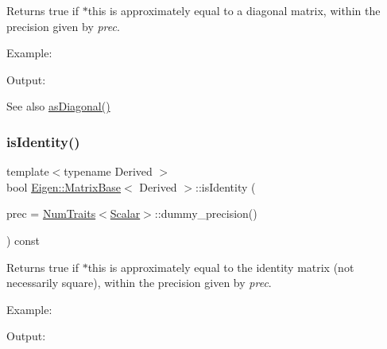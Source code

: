 \begin{DoxyReturn}{Returns}
true if $\ast$this is approximately equal to a diagonal matrix, within the precision given by {\itshape prec}.
\end{DoxyReturn}
Example\+: 
\begin{DoxyCodeInclude}{0}
\end{DoxyCodeInclude}
 Output\+: 
\begin{DoxyVerbInclude}
\end{DoxyVerbInclude}


\begin{DoxySeeAlso}{See also}
\mbox{\hyperlink{class_eigen_1_1_matrix_base_a14235b62c90f93fe910070b4743782d0}{as\+Diagonal()}} 
\end{DoxySeeAlso}
\mbox{\label{class_eigen_1_1_matrix_base_a4ccbd8dfa06e9d47b9bf84711f8b9d40}} 
\subsubsection{\texorpdfstring{isIdentity()}{isIdentity()}}
{\footnotesize\ttfamily template$<$typename Derived $>$ \\
bool \mbox{\hyperlink{class_eigen_1_1_matrix_base}{Eigen\+::\+Matrix\+Base}}$<$ Derived $>$\+::is\+Identity (\begin{DoxyParamCaption}\item[{const Real\+Scalar \&}]{prec = {\ttfamily \mbox{\hyperlink{struct_eigen_1_1_num_traits}{Num\+Traits}}$<$\mbox{\hyperlink{class_eigen_1_1_dense_base_a5feed465b3a8e60c47e73ecce83e39a2}{Scalar}}$>$\+:\+:dummy\+\_\+precision()} }\end{DoxyParamCaption}) const}

\begin{DoxyReturn}{Returns}
true if $\ast$this is approximately equal to the identity matrix (not necessarily square), within the precision given by {\itshape prec}.
\end{DoxyReturn}
Example\+: 
\begin{DoxyCodeInclude}{0}
\end{DoxyCodeInclude}
 Output\+: 
\begin{DoxyVerbInclude}
\end{DoxyVerbInclude}


